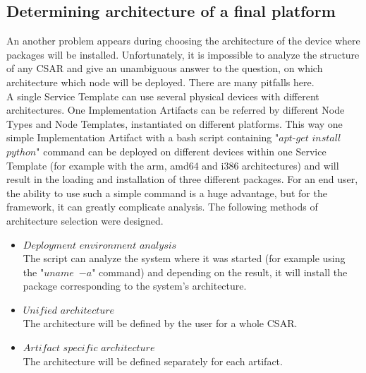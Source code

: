 \subsection{Determining architecture of a final platform}
An another problem appears during choosing the architecture of the device where packages will be installed.
Unfortunately, it is impossible to analyze the structure of any CSAR and give an unambiguous answer to the question, on which architecture which node will be deployed.
There are many pitfalls here.\\
A single Service Template can use several physical devices with different architectures.
One Implementation Artifacts can be referred by different Node Types and Node Templates, instantiated on different platforms.
This way one simple Implementation Artifact with a bash script containing "$apt$-$get$ $install$ $python$" command can be deployed on different devices within one Service Template (for example with the arm, amd64 and i386 architectures) and will result in the loading and installation of three different packages. 
For an end user, the ability to use such a simple command is a huge advantage, but for the framework, it can greatly complicate analysis.
The following methods of architecture selection were designed.
\begin{itemize}
	\item $Deployment$ $environment$ $analysis$\\
	The script can analyze the system where it was started (for example using the "$uname$~$-a$" command) and depending on the result, it will install the package corresponding to the system's architecture.
	\item $Unified$ $architecture$\\
	The architecture will be defined by the user for a whole CSAR.
	\item $Artifact$ $specific$ $architecture$\\
	The architecture will be defined separately for each artifact.
\end{itemize}
